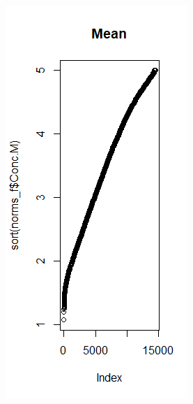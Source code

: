 \documentclass[11pt,a4paper]{article}
\begin{document}
\begin{figure}[H]
  \centering
  \begin{subfigure}[b]{0.4\linewidth}
    \includegraphics[width=\linewidth]{images/mean_norm.png}

\end{subfigure}
\end{figure}
\end{document}
